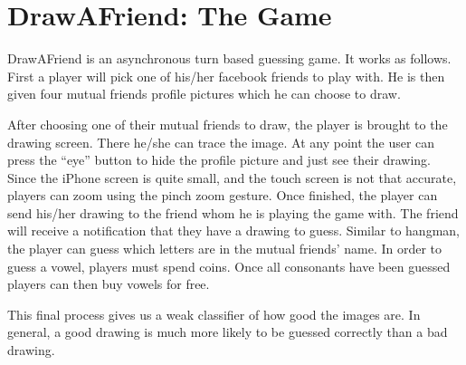 \section{DrawAFriend: The Game}

DrawAFriend is an asynchronous turn based guessing game. It works as follows. First a player will pick one of his/her facebook friends to play with. He is then given four mutual friends profile pictures which he can choose to draw. 

After choosing one of their mutual friends to draw, the player is brought to the drawing screen. There he/she can trace the image. At any point the user can press the “eye” button to hide the profile picture and just see their drawing.  Since the iPhone screen is quite small, and the touch screen is not that accurate, players can zoom using the pinch zoom gesture. 
Once finished, the player can send his/her drawing to the friend whom he is playing the game with. The friend will receive a notification that they have a drawing to guess. Similar to hangman, the player can guess which letters are in the mutual friends’ name. In order to guess a vowel, players must spend coins. Once all consonants have been guessed players can then buy vowels for free. 

This final process gives us a weak classifier of how good the images are. In general, a good drawing is much more likely to be guessed correctly than a bad drawing.
